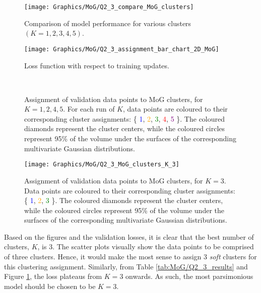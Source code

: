 \documentclass[a4paper,12pt]{article}
\begin{document}
\begin{figure}[!htb]
\centering
\texttt{[image: Graphics/MoG/Q2\_3\_compare\_MoG\_clusters]}
\caption{Comparison of model performance for various clusters $(K = 1, 2, 3, 4, 5)$.}
\label{fig:MoG/Q2_3_compare_clusters}
\end{figure}

\begin{figure}[!htb]
\centering
\texttt{[image: Graphics/MoG/Q2\_3\_assignment\_bar\_chart\_2D\_MoG]}
\caption{Loss function with respect to training updates.}
\label{fig:MoG/Q2_3_assignment_bar_chart}
\end{figure}

\begin{figure}[!htb]
\centering
{}
 \\
\caption{Assignment of validation data points to MoG clusters, for $K = 1, 2, 4, 5$. For each run of $K$, data points are coloured to their corresponding cluster assignments: \{ \textcolor{blue}{1}, \textcolor{orange}{2}, \textcolor{green}{3}, \textcolor{red}{4}, \textcolor{purple}{5} \}. The coloured diamonds represent the cluster centers, while the coloured circles represent 95\% of the volume under the surfaces of the corresponding multivariate Gaussian distributions.}
\label{fig:MoG/Q2_3_cluster_viz_first}
\end{figure}

\clearpage

\begin{figure}[!htb]
\centering
\texttt{[image: Graphics/MoG/Q2\_3\_MoG\_clusters\_K\_3]}
\caption{Assignment of validation data points to MoG clusters, for $K = 3$. Data points are coloured to their corresponding cluster assignments: \{ \textcolor{blue}{1}, \textcolor{orange}{2}, \textcolor{green}{3} \}. The coloured diamonds represent the cluster centers, while the coloured circles represent 95\% of the volume under the surfaces of the corresponding multivariate Gaussian distributions.}
\label{fig:MoG/Q2_3_cluster_viz_second}
\end{figure}

Based on the figures and the validation losses, it is clear that the best number of clusters, $K$, is 3. The scatter plots visually show the data points to be comprised of three clusters. Hence, it would make the most sense to assign 3 \textit{soft} clusters for this clustering assignment. Similarly, from Table \ref{tab:MoG/Q2_3_results} and Figure \ref{fig:MoG/Q2_3_compare_clusters}, the loss plateaus from $K=3$ onwards. As such, the most parsimonious model should be chosen to be $K=3$.
\end{document}
